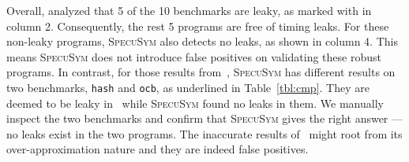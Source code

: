 \documentclass[sigconf]{acmart}
\newcommand{\SpecuSym}{\textsc{SpecuSym} }
\begin{document}
\begin{table}
\caption{Comparison betwee Wu et.al~\cite{WuW19} and \SpecuSym}
\label{tbl:cmp}
\centering
{}
\end{table}


Overall, \cite{WuW19} analyzed that 5 of the 10 benchmarks are leaky, 
as marked with  in column 2. Consequently, the rest 5 programs are 
free of timing leaks. For these non-leaky programs, \SpecuSym also detects 
no leaks, as shown in column 4. This means \SpecuSym does not introduce false 
positives on validating these robust programs. In contrast, for those 
results from~\cite{WuW19}, \SpecuSym has different results on two benchmarks, 
\texttt{hash} and \texttt{ocb}, as underlined in Table~\ref{tbl:cmp}. 
They are deemed to be leaky in~\cite{WuW19} while \SpecuSym found no leaks in 
them. We manually inspect the two benchmarks and confirm that \SpecuSym gives 
the right answer --- no leaks exist in the two programs. The inaccurate results 
of~\cite{WuW19} might root from its over-approximation nature and they are 
indeed false positives.
\end{document}
